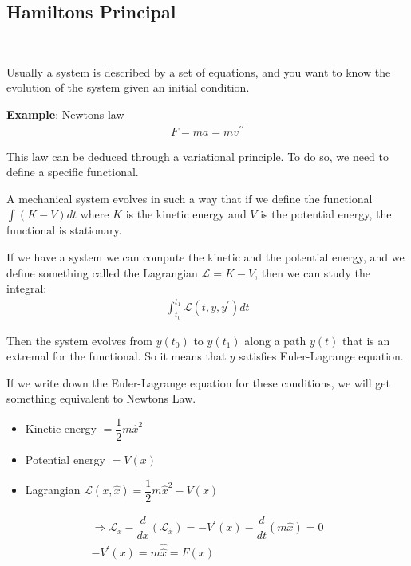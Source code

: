 \subsection{Hamiltons Principal}\hfill\\\par
\noindent Usually a system is described by a set of equations, and you want to know the evolution of the system given an initial condition.
\par\bigskip
\noindent\textbf{Example}: Newtons law
\begin{equation*}
  \begin{gathered}
    F = ma = mv^{\prime\prime}
  \end{gathered}
\end{equation*}\par
\noindent This law can be deduced through a variational principle. To do so, we need to define a specific functional. 
\par\bigskip
\noindent A mechanical system evolves in such a way that if we define the functional $\int (K-V)dt$ where $K$ is the kinetic energy and $V$ is the potential energy, the functional is stationary.\par
\noindent If we have a system we can compute the kinetic and the potential energy, and we define something called the Lagrangian $\mathcal{L} = K-V$, then we can study the integral:
\begin{equation*}
  \begin{gathered}
    \int_{t_0}^{t_1}\mathcal{L}(t,y,y^{\prime})dt
  \end{gathered}
\end{equation*}\par
\noindent Then the system evolves from $y(t_0)$ to $y(t_1)$ along a path $y(t)$ that is an extremal for the functional. So it means that $y$ satisfies Euler-Lagrange equation.\par
\noindent If we write down the Euler-Lagrange equation for these conditions, we will get something equivalent to Newtons Law.\par
\begin{itemize}
  \item Kinetic energy $ = \dfrac{1}{2}m\hat{x}^2$
  \item Potential energy $ = V(x)$
  \item Lagrangian $\mathcal{L}(x,\hat{x}) = \dfrac{1}{2}m\hat{x}^2-V(x)$
\end{itemize}
\begin{equation*}
  \begin{gathered}
    \Rightarrow \mathcal{L}_x-\dfrac{d}{dx}\left(\mathcal{L}_{\hat{x}}\right) = -V^{\prime}(x)-\dfrac{d}{dt}\left(m\hat{x}\right) = 0\\
    -V^{\prime}(x) = m\hat{\hat{x}} = F(x)
  \end{gathered}
\end{equation*}
